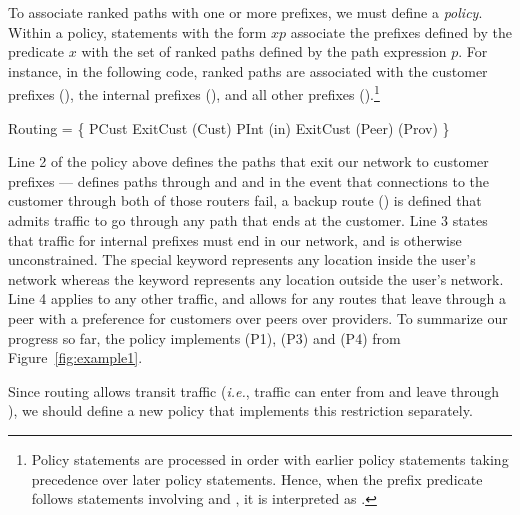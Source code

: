 
To associate ranked paths with
one or more prefixes, we must define a \sysname \emph{policy}.
Within a policy, statements with the form $x$\Path$p$
associate the prefixes defined by the predicate $x$ with the set of
ranked paths defined by the path expression $p$.
For instance, in the following code, ranked paths are associated with
the customer prefixes (), the internal prefixes (),
and all other prefixes ().\footnote{Policy statements are processed in
order with earlier policy statements taking precedence over later
policy statements.  Hence, when the prefix predicate \True follows
statements involving  and , it is interpreted as
.}


\begin{code}
\Define Routing = \{
     PCust \Path ExitCust \Prefer \End(Cust)
     PInt  \Path \End(in)
     \True  \Path ExitCust \Prefer \Exit(Peer) \Prefer \Exit(Prov)
\}
\end{code}
\noindent
Line 2 of the policy above
defines the paths that exit our network to customer prefixes ---
 defines paths through  and  and in the event
that connections to the customer through both of those routers fail,
a backup route () is defined that admits traffic to go through
any path that ends at the customer.
Line 3 states that traffic for internal prefixes must end in our network, and is otherwise unconstrained.  The special keyword \In{} represents any location
inside the user's network whereas the keyword \Out{} represents any location
outside the user's network.
Line 4 applies to any other traffic, and allows for any routes that leave through a peer with a preference for customers over peers over providers. To summarize our progress so far, the  policy
implements (P1), (P3) and (P4) from Figure~\ref{fig:example1}.

Since routing allows transit traffic (\emph{i.e.}, traffic can enter from 
 and leave through ), we should define a new policy that
implements this restriction separately.

